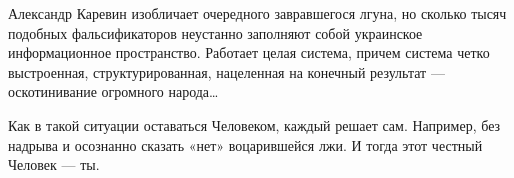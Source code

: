 Александр Каревин изобличает очередного завравшегося лгуна, но сколько тысяч
подобных фальсификаторов неустанно заполняют собой украинское информационное
пространство. Работает целая система, причем система четко выстроенная,
структурированная, нацеленная на конечный результат — оскотинивание огромного
народа…

Как в такой ситуации оставаться Человеком, каждый решает сам. Например, без
надрыва и осознанно сказать «нет» воцарившейся лжи. И тогда этот честный
Человек — ты.


